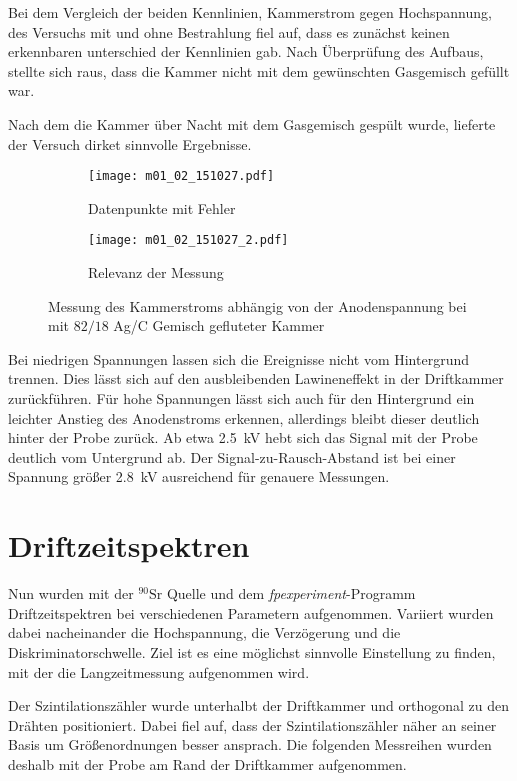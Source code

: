 \documentclass[11pt, ngerman, fleqn, DIV=15, headinclude, BCOR=2cm]{scrreprt}
\begin{document}
Bei dem Vergleich der beiden Kennlinien, Kammerstrom gegen Hochspannung,
des Versuchs mit und ohne Bestrahlung fiel auf, dass es zunächst keinen
erkennbaren unterschied der Kennlinien gab.
Nach Überprüfung des Aufbaus, stellte sich raus, dass die Kammer nicht mit dem 
gewünschten Gasgemisch gefüllt war.

Nach dem die Kammer über Nacht mit dem Gasgemisch gespült wurde, lieferte der
Versuch dirket sinnvolle Ergebnisse.

\begin{figure}
	\centering
	\begin{subfigure}{0.49 \linewidth}
        \texttt{[image: m01\_02\_151027.pdf]}
        \caption{%
		Datenpunkte mit Fehler
        }
        \label{fig:m01_02_messdaten}
    \end{subfigure}
    \begin{subfigure}{0.49 \linewidth}
        \texttt{[image: m01\_02\_151027\_2.pdf]}
        \caption{%
		Relevanz der Messung
       }
        \label{fig:m01_02_relevanz}
    \end{subfigure}
    \caption{%
	    Messung des Kammerstroms abhängig von der Anodenspannung bei mit
	    $82/18$ Ag/C Gemisch gefluteter Kammer
    }
    \label{fig:m01_02_plots}
\end{figure}

Bei niedrigen Spannungen lassen sich die Ereignisse nicht vom Hintergrund
trennen. 
Dies lässt sich auf den ausbleibenden Lawineneffekt in der Driftkammer
zurückführen.
Für hohe Spannungen lässt sich auch für den Hintergrund ein leichter
Anstieg des Anodenstroms erkennen, allerdings bleibt dieser deutlich hinter der
Probe zurück.
Ab etwa \SI{2.5}{\kilo\volt} hebt sich das Signal mit der Probe deutlich vom
Untergrund ab. Der Signal-zu-Rausch-Abstand ist bei einer Spannung größer
\SI{2.8}{\kilo\volt} ausreichend für genauere Messungen.

\section{Driftzeitspektren}
Nun wurden mit der $^{90}\text{Sr}$ Quelle und dem \emph{fpexperiment}-Programm
Driftzeitspektren bei verschiedenen Parametern aufgenommen.
Variiert wurden dabei nacheinander die Hochspannung, die Verzögerung und die
Diskriminatorschwelle.
Ziel ist es eine möglichst sinnvolle Einstellung zu finden, mit der die
Langzeitmessung aufgenommen wird.

Der Szintilationszähler wurde unterhalbt der Driftkammer und orthogonal zu
den Drähten positioniert.
Dabei fiel auf, dass der Szintilationszähler näher an seiner Basis um
Größenordnungen  besser ansprach.
Die folgenden Messreihen wurden deshalb mit der Probe am Rand der
Driftkammer aufgenommen.
\end{document}
